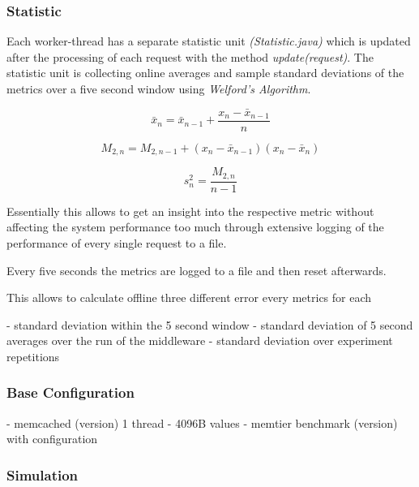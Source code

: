 \documentclass[11pt,a4paper]{article}
\begin{document}
\subsubsection{Statistic}

Each worker-thread has a separate statistic unit \emph{(Statistic.java)} which is updated after the processing of each request with the method \emph{update(request)}.  
The statistic unit is collecting online averages and sample standard deviations of the metrics over a five second window using \emph{Welford's Algorithm}.\cite{Knuth:1997:ACP:270146}


\begin{equation}
	\bar{x}_n = \bar{x}_{n-1} + \frac{x_n -\bar{x}_{n-1}}{n}
\end{equation}

\begin{equation}
	M_{2,n} = M_{2,n-1} + (x_n - \bar{x}_{n-1})(x_n - \bar{x}_n)
\end{equation}

\begin{equation}
	s^2_n = \frac{M_{2,n}}{n-1}
\end{equation}

Essentially this allows to get an insight into the respective metric without affecting the system performance too much through extensive logging of the performance of every single request to a file. 

Every five seconds the metrics are logged to a file and then reset afterwards.

This allows to calculate offline three different error every metrics for each 

- standard deviation within the 5 second window
- standard deviation of 5 second averages over the run of the middleware
- standard deviation over experiment repetitions 



\subsubsection{Base Configuration}
- memcached (version) 1 thread
- 4096B values
- memtier benchmark (version) with configuration
\subsubsection{Simulation}\label{simulation}
\end{document}
